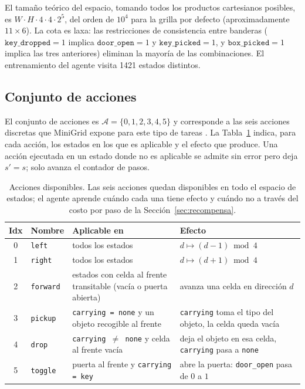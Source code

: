 \documentclass[11pt,a4paper]{article}
\begin{document}
El tamaño teórico del espacio, tomando todos los productos cartesianos
posibles, es \(W \cdot H \cdot 4 \cdot 4 \cdot 2^5\), del orden de
\(10^4\) para la grilla por defecto (aproximadamente \(11\times 6\)).
La cota es laxa: las restricciones de consistencia entre banderas
(\(\texttt{key\_dropped}=1\) implica \(\texttt{door\_open}=1\) y
\(\texttt{key\_picked}=1\), y \(\texttt{box\_picked}=1\) implica las
tres anteriores) eliminan la mayoría de las combinaciones. El
entrenamiento del agente visita \num{1421} estados distintos.

\subsection{Conjunto de acciones}

El conjunto de acciones es \(\mathcal{A} = \{0,1,2,3,4,5\}\) y
corresponde a las seis acciones discretas que MiniGrid expone para este
tipo de tareas \cite{minigrid}. La Tabla~\ref{tab:actions} indica, para
cada acción, los estados en los que es aplicable y el efecto que
produce. Una acción ejecutada en un estado donde no es aplicable se
admite sin error pero deja \(s' = s\); solo avanza el contador de pasos.

\begin{table}[h]
  \centering
  \small
  \setlength{\extrarowheight}{3pt}
  \begin{tabularx}{\linewidth}{c l X X}
    \toprule
    \textbf{Idx} & \textbf{Nombre} & \textbf{Aplicable en} & \textbf{Efecto} \\
    \midrule
    0 & \texttt{left}    & todos los estados & \(d \mapsto (d-1) \bmod 4\) \\
    1 & \texttt{right}   & todos los estados & \(d \mapsto (d+1) \bmod 4\) \\
    2 & \texttt{forward} & estados con celda al frente transitable (vacía o puerta abierta) & avanza una celda en dirección \(d\) \\
    3 & \texttt{pickup}  & \texttt{carrying = none} y un objeto recogible al frente & \texttt{carrying} toma el tipo del objeto, la celda queda vacía \\
    4 & \texttt{drop}    & \texttt{carrying \(\neq\) none} y celda al frente vacía & deja el objeto en esa celda, \texttt{carrying} pasa a \texttt{none} \\
    5 & \texttt{toggle}  & puerta al frente y \texttt{carrying = key} & abre la puerta: \texttt{door\_open} pasa de \(0\) a \(1\) \\
    \bottomrule
  \end{tabularx}
  \caption{Acciones disponibles. Las seis acciones quedan disponibles
  en todo el espacio de estados; el agente aprende cuándo cada una tiene
  efecto y cuándo no a través del costo por paso de la
  Sección~\ref{sec:recompensa}.}
  \label{tab:actions}
\end{table}
\end{document}
